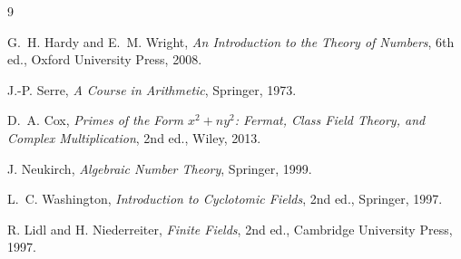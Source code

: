 \documentclass[11pt]{article}
\theoremstyle{remark}
\begin{document}
\begin{thebibliography}{9}

G.~H. Hardy and E.~M. Wright,
\emph{An Introduction to the Theory of Numbers},
6th ed., Oxford University Press, 2008.

J.-P. Serre,
\emph{A Course in Arithmetic},
Springer, 1973.

D.~A. Cox,
\emph{Primes of the Form $x^2+ny^2$: Fermat, Class Field Theory, and Complex Multiplication},
2nd ed., Wiley, 2013.

J. Neukirch,
\emph{Algebraic Number Theory},
Springer, 1999.

L.~C. Washington,
\emph{Introduction to Cyclotomic Fields},
2nd ed., Springer, 1997.

R. Lidl and H. Niederreiter,
\emph{Finite Fields},
2nd ed., Cambridge University Press, 1997.

\end{thebibliography}
\end{document}
